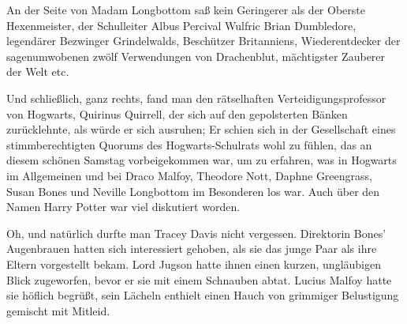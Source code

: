 An der Seite von Madam Longbottom saß kein Geringerer als der Oberste Hexenmeister, der Schulleiter Albus Percival Wulfric Brian Dumbledore, legendärer Bezwinger Grindelwalds, Beschützer Britanniens, Wiederentdecker der sagenumwobenen zwölf Verwendungen von Drachenblut, mächtigster Zauberer der Welt etc.

Und schließlich, ganz rechts, fand man den rätselhaften Verteidigungsprofessor von Hogwarts, Quirinus Quirrell, der sich auf den gepolsterten Bänken zurücklehnte, als würde er sich ausruhen; Er schien sich in der Gesellschaft eines stimmberechtigten Quorums des Hogwarts-Schulrats wohl zu fühlen, das an diesem schönen Samstag vorbeigekommen war, um zu erfahren, was in Hogwarts im Allgemeinen und bei Draco Malfoy, Theodore Nott, Daphne Greengrass, Susan Bones und Neville Longbottom im Besonderen los war. Auch über den Namen Harry Potter war viel diskutiert worden.

Oh, und natürlich durfte man Tracey Davis nicht vergessen. Direktorin Bones' Augenbrauen hatten sich interessiert gehoben, als sie das junge Paar als ihre Eltern vorgestellt bekam. Lord Jugson hatte ihnen einen kurzen, ungläubigen Blick zugeworfen, bevor er sie mit einem Schnauben abtat. Lucius Malfoy hatte sie höflich begrüßt, sein Lächeln enthielt einen Hauch von grimmiger Belustigung gemischt mit Mitleid.


